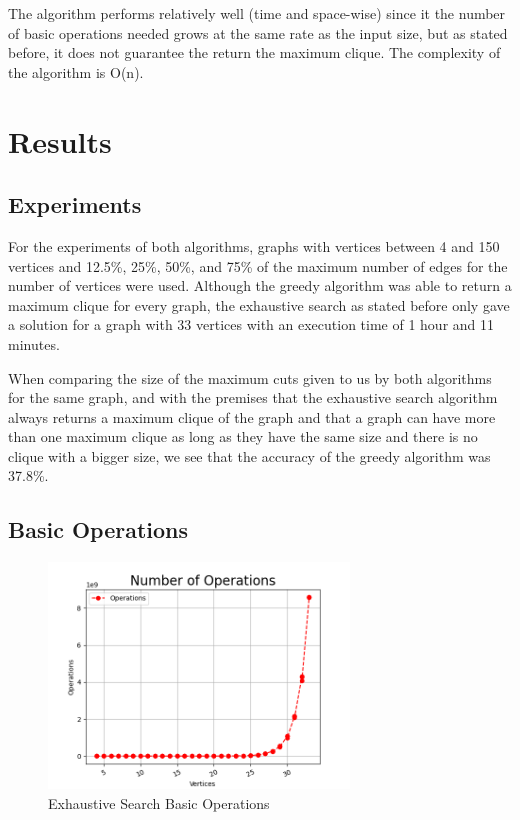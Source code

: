 \documentclass[]{revdetua}
\begin{document}
The algorithm performs relatively well (time and space-wise) since it the number of basic operations needed grows at the same rate as the input size, but as stated before, it does not guarantee the return the maximum clique. The complexity of the algorithm is O(n).

\section{Results}

\subsection{Experiments}

For the experiments of both algorithms, graphs with vertices between 4 and 150 vertices and 12.5\%, 25\%, 50\%, and 75\% of the maximum number of edges for the number of vertices were used. Although the greedy algorithm was able to return a maximum clique for every graph, the exhaustive search as stated before only gave a solution for a graph with 33 vertices with an execution time of 1 hour and 11 minutes.

When comparing the size of the maximum cuts given to us by both algorithms for the same graph, and with the premises that the exhaustive search algorithm always returns a maximum clique of the graph and that a graph can have more than one maximum clique as long as they have the same size and there is no clique with a bigger size, we see that the accuracy of the greedy algorithm was 37.8\%. 

\subsection{Basic Operations}

\begin{figure}[h]
    \centering
    \includegraphics[width=8cm]{operations_exhaustive.png}
    \caption{Exhaustive Search Basic Operations}
\end{figure}
\end{document}
